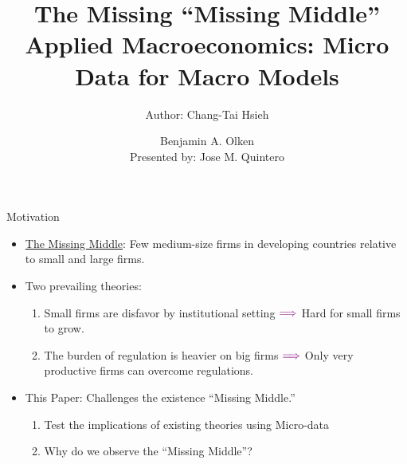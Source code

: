 \documentclass[usenames,dvipsnames,aspectratio=169]{beamer}
\title{The Missing ``Missing Middle'' \\ \small{Applied Macroeconomics: Micro Data for Macro Models} }
\author{Author: Chang-Tai Hsieh \and Benjamin A. Olken \\ Presented by: Jose M. Quintero}
\begin{document}
\begin{frame}
  \titlepage
\end{frame}

\begin{frame}{Motivation}
    \begin{itemize}[label=\textcolor{violet}{$\blacktriangleright$}]
        \item \underline{The Missing Middle}: Few medium-size firms in developing countries relative to small and large firms. 
        \vfill
        \item Two prevailing theories:
        \begin{enumerate}[label=\textbf{\textcolor{violet}{\arabic*.}}]
            \item Small firms are disfavor by institutional setting $\textcolor{violet}{\Longrightarrow}$ Hard for small firms to grow.
            \item The burden of regulation is heavier on big firms $\textcolor{violet}{\Longrightarrow}$ Only very productive firms can overcome regulations. 
        \end{enumerate}
        \vfill 
        \item This Paper: Challenges the existence ``Missing Middle.''
        \begin{enumerate}[label=\textbf{\textcolor{violet}{\arabic*.}}]
            \item Test the implications of existing theories using Micro-data
            \item Why do we observe the ``Missing Middle''? 
        \end{enumerate}     
    \end{itemize}
\end{frame}
\end{document}
